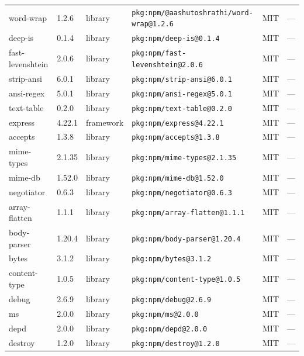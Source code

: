 \documentclass[11pt,a4paper]{article}
\begin{document}
\begin{longtable}{|p{4cm}|p{2cm}|p{1.6cm}|p{5cm}|p{1.5cm}|p{3.5cm}|}
\raggedright word-wrap & 1.2.6 & library & \small\texttt{pkg:npm/@aashutoshrathi/word-wrap@1.2.6} & MIT & \small — \\
\raggedright deep-is & 0.1.4 & library & \small\texttt{pkg:npm/deep-is@0.1.4} & MIT & \small — \\
\raggedright fast-levenshtein & 2.0.6 & library & \small\texttt{pkg:npm/fast-levenshtein@2.0.6} & MIT & \small — \\
\raggedright strip-ansi & 6.0.1 & library & \small\texttt{pkg:npm/strip-ansi@6.0.1} & MIT & \small — \\
\raggedright ansi-regex & 5.0.1 & library & \small\texttt{pkg:npm/ansi-regex@5.0.1} & MIT & \small — \\
\raggedright text-table & 0.2.0 & library & \small\texttt{pkg:npm/text-table@0.2.0} & MIT & \small — \\
\raggedright express & 4.22.1 & framework & \small\texttt{pkg:npm/express@4.22.1} & MIT & \small — \\
\raggedright accepts & 1.3.8 & library & \small\texttt{pkg:npm/accepts@1.3.8} & MIT & \small — \\
\raggedright mime-types & 2.1.35 & library & \small\texttt{pkg:npm/mime-types@2.1.35} & MIT & \small — \\
\raggedright mime-db & 1.52.0 & library & \small\texttt{pkg:npm/mime-db@1.52.0} & MIT & \small — \\
\raggedright negotiator & 0.6.3 & library & \small\texttt{pkg:npm/negotiator@0.6.3} & MIT & \small — \\
\raggedright array-flatten & 1.1.1 & library & \small\texttt{pkg:npm/array-flatten@1.1.1} & MIT & \small — \\
\raggedright body-parser & 1.20.4 & library & \small\texttt{pkg:npm/body-parser@1.20.4} & MIT & \small — \\
\raggedright bytes & 3.1.2 & library & \small\texttt{pkg:npm/bytes@3.1.2} & MIT & \small — \\
\raggedright content-type & 1.0.5 & library & \small\texttt{pkg:npm/content-type@1.0.5} & MIT & \small — \\
\raggedright debug & 2.6.9 & library & \small\texttt{pkg:npm/debug@2.6.9} & MIT & \small — \\
\raggedright ms & 2.0.0 & library & \small\texttt{pkg:npm/ms@2.0.0} & MIT & \small — \\
\raggedright depd & 2.0.0 & library & \small\texttt{pkg:npm/depd@2.0.0} & MIT & \small — \\
\raggedright destroy & 1.2.0 & library & \small\texttt{pkg:npm/destroy@1.2.0} & MIT & \small — \\

\end{longtable}
\end{document}
